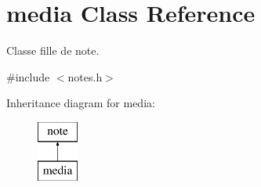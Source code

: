 \hypertarget{classmedia}{}\section{media Class Reference}
\label{classmedia}


Classe fille de note.  




{\ttfamily \#include $<$notes.\+h$>$}

Inheritance diagram for media\+:\begin{figure}[H]
\begin{center}
\leavevmode
\includegraphics[height=2.000000cm]{classmedia}
\end{center}
\end{figure}
